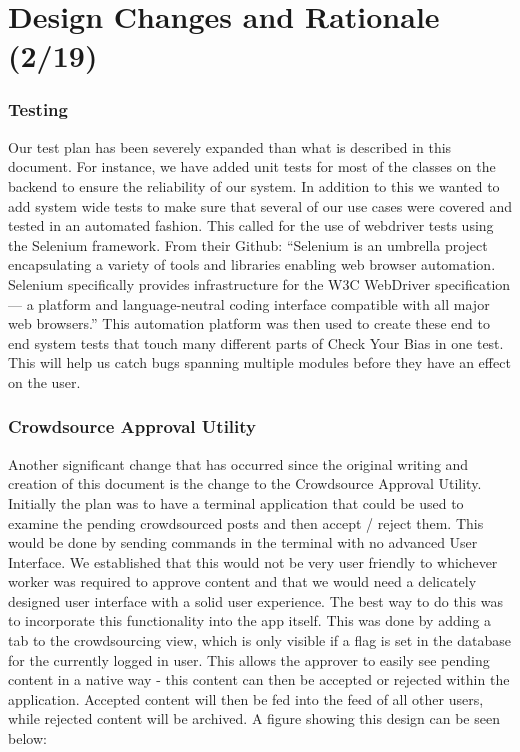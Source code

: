 \documentclass[11pt]{article}
\begin{document}
\newpage

\section{Design Changes and Rationale (2/19)}

\subsubsection{Testing}

Our test plan has been severely expanded than what is described in this document. For instance, we have added unit tests for most of the classes on the backend to ensure the reliability of our system. In addition to this we wanted to add system wide tests to make sure that several of our use cases were covered and tested in an automated fashion. This called for the use of webdriver tests using the Selenium framework. From their Github: ``Selenium is an umbrella project encapsulating a variety of tools and libraries enabling web browser automation. Selenium specifically provides infrastructure for the W3C WebDriver specification — a platform and language-neutral coding interface compatible with all major web browsers.'' This automation platform was then used to create these end to end system tests that touch many different parts of Check Your Bias in one test. This will help us catch bugs spanning multiple modules before they have an effect on the user.

\subsubsection{Crowdsource Approval Utility}

Another significant change that has occurred since the original writing and creation of this document is the change to the Crowdsource Approval Utility. Initially the plan was to have a terminal application that could be used to examine the pending crowdsourced posts and then accept / reject them. This would be done by sending commands in the terminal with no advanced User Interface. We established that this would not be very user friendly to whichever worker was required to approve content and that we would need a delicately designed user interface with a solid user experience. The best way to do this was to incorporate this functionality into the app itself. This was done by adding a tab to the crowdsourcing view, which is only visible if a flag is set in the database for the currently logged in user. This allows the approver to easily see pending content in a native way - this content can then be accepted or rejected within the application. Accepted content will then be fed into the feed of all other users, while rejected content will be archived. A figure showing this design can be seen below:\\
\end{document}
